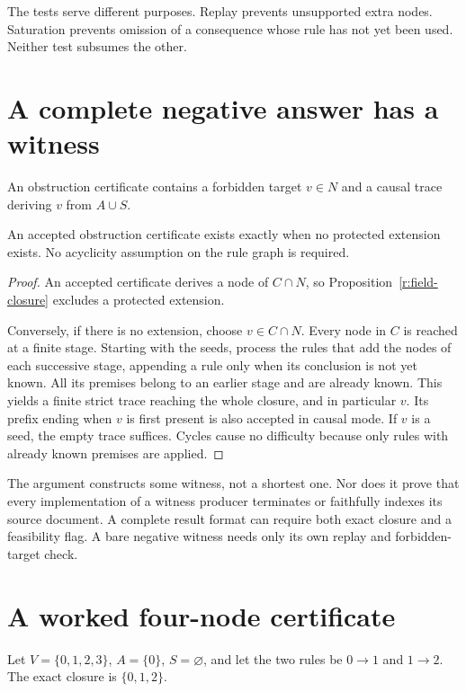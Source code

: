 The tests serve different purposes. Replay prevents unsupported extra nodes. Saturation prevents omission of a consequence whose rule has not yet been used. Neither test subsumes the other.

\section{A complete negative answer has a witness}
An obstruction certificate contains a forbidden target $v\in N$ and a causal trace deriving $v$ from $A\cup S$.

\begin{theorem}\label{r:field-obstruction}
An accepted obstruction certificate exists exactly when no protected extension exists. No acyclicity assumption on the rule graph is required.
\end{theorem}
\begin{proof}
An accepted certificate derives a node of $C\cap N$, so Proposition~\ref{r:field-closure} excludes a protected extension.

Conversely, if there is no extension, choose $v\in C\cap N$. Every node in $C$ is reached at a finite stage. Starting with the seeds, process the rules that add the nodes of each successive stage, appending a rule only when its conclusion is not yet known. All its premises belong to an earlier stage and are already known. This yields a finite strict trace reaching the whole closure, and in particular $v$. Its prefix ending when $v$ is first present is also accepted in causal mode. If $v$ is a seed, the empty trace suffices. Cycles cause no difficulty because only rules with already known premises are applied.
\end{proof}

The argument constructs some witness, not a shortest one. Nor does it prove that every implementation of a witness producer terminates or faithfully indexes its source document. A complete result format can require both exact closure and a feasibility flag. A bare negative witness needs only its own replay and forbidden-target check.

\section{A worked four-node certificate}
Let $V=\{0,1,2,3\}$, $A=\{0\}$, $S=\varnothing$, and let the two rules be $0\to1$ and $1\to2$. The exact closure is $\{0,1,2\}$.

